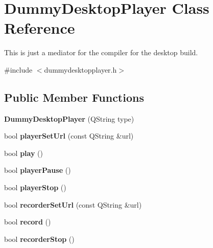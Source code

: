 \hypertarget{classDummyDesktopPlayer}{\section{Dummy\-Desktop\-Player Class Reference}
\label{classDummyDesktopPlayer}
}


This is just a mediator for the compiler for the desktop build.  




{\ttfamily \#include $<$dummydesktopplayer.\-h$>$}

\subsection*{Public Member Functions}
\begin{DoxyCompactItemize}
\item 
\hypertarget{classDummyDesktopPlayer_a44553faac8ad1bbf9a06b535b60eb5d2}{{\bfseries Dummy\-Desktop\-Player} (Q\-String type)}\label{classDummyDesktopPlayer_a44553faac8ad1bbf9a06b535b60eb5d2}

\item 
\hypertarget{classDummyDesktopPlayer_a20386ab7b3674c1e0f64d2ada4a2e640}{bool {\bfseries player\-Set\-Url} (const Q\-String \&url)}\label{classDummyDesktopPlayer_a20386ab7b3674c1e0f64d2ada4a2e640}

\item 
\hypertarget{classDummyDesktopPlayer_a57a6fb514856b54995f6a7ed992ada88}{bool {\bfseries play} ()}\label{classDummyDesktopPlayer_a57a6fb514856b54995f6a7ed992ada88}

\item 
\hypertarget{classDummyDesktopPlayer_a383a9edc3dbc42962ab21b206b58af09}{bool {\bfseries player\-Pause} ()}\label{classDummyDesktopPlayer_a383a9edc3dbc42962ab21b206b58af09}

\item 
\hypertarget{classDummyDesktopPlayer_ac2967f36941f7853dafb1494cc5bccbe}{bool {\bfseries player\-Stop} ()}\label{classDummyDesktopPlayer_ac2967f36941f7853dafb1494cc5bccbe}

\item 
\hypertarget{classDummyDesktopPlayer_ae9a4f826a6d5a7abf2bdd49465e4bc04}{bool {\bfseries recorder\-Set\-Url} (const Q\-String \&url)}\label{classDummyDesktopPlayer_ae9a4f826a6d5a7abf2bdd49465e4bc04}

\item 
\hypertarget{classDummyDesktopPlayer_a9db8b2bcce1c0e28e4f649102756f90d}{bool {\bfseries record} ()}\label{classDummyDesktopPlayer_a9db8b2bcce1c0e28e4f649102756f90d}

\item 
\hypertarget{classDummyDesktopPlayer_a5920d699627e4ce65010bf094a18e0d7}{bool {\bfseries recorder\-Stop} ()}\label{classDummyDesktopPlayer_a5920d699627e4ce65010bf094a18e0d7}

\end{DoxyCompactItemize}
